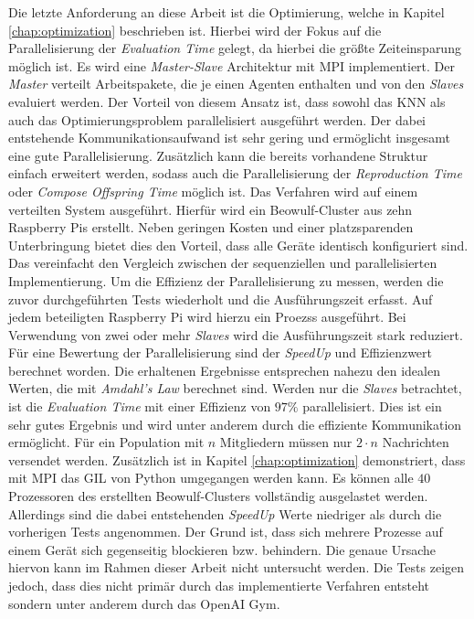 Die letzte Anforderung an diese Arbeit ist die Optimierung, welche in Kapitel \ref{chap:optimization} beschrieben ist. Hierbei wird der Fokus auf die Parallelisierung der \emph{Evaluation Time} gelegt, da hierbei die größte Zeiteinsparung möglich ist. Es wird eine \emph{Master-Slave} Architektur mit \ac{MPI} implementiert. Der \emph{Master} verteilt Arbeitspakete, die je einen Agenten enthalten und von den \emph{Slaves} evaluiert werden. Der Vorteil von diesem Ansatz ist, dass sowohl das \ac{KNN} als auch das Optimierungsproblem parallelisiert ausgeführt werden. Der dabei entstehende Kommunikationsaufwand ist sehr gering und ermöglicht insgesamt eine gute Parallelisierung. Zusätzlich kann die bereits vorhandene Struktur einfach erweitert werden, sodass auch die Parallelisierung der \emph{Reproduction Time} oder \emph{Compose Offspring Time} möglich ist. Das Verfahren wird auf einem verteilten System ausgeführt. Hierfür wird ein Beowulf-Cluster aus zehn Raspberry Pis erstellt. Neben geringen Kosten und einer platzsparenden Unterbringung bietet dies den Vorteil, dass alle Geräte identisch konfiguriert sind. Das vereinfacht den Vergleich zwischen der sequenziellen und parallelisierten Implementierung. Um die Effizienz der Parallelisierung zu messen, werden die zuvor durchgeführten Tests wiederholt und die Ausführungszeit erfasst. Auf jedem beteiligten Raspberry Pi wird hierzu ein Proezss ausgeführt. Bei Verwendung von zwei oder mehr \emph{Slaves} wird die Ausführungszeit stark reduziert. Für eine Bewertung der Parallelisierung sind der \emph{SpeedUp} und Effizienzwert berechnet worden. Die erhaltenen Ergebnisse entsprechen nahezu den idealen Werten, die mit \emph{Amdahl's Law} berechnet sind. Werden nur die \emph{Slaves} betrachtet, ist die \emph{Evaluation Time} mit einer Effizienz von $97\%$ parallelisiert. Dies ist ein sehr gutes Ergebnis und wird unter anderem durch die effiziente Kommunikation ermöglicht. Für ein Population mit $n$ Mitgliedern müssen nur $2 \cdot n$ Nachrichten versendet werden. Zusätzlich ist in Kapitel \ref{chap:optimization} demonstriert, dass mit \ac{MPI} das \ac{GIL} von Python umgegangen werden kann. Es können alle $40$ Prozessoren des erstellten Beowulf-Clusters vollständig ausgelastet werden. Allerdings sind die dabei entstehenden \emph{SpeedUp} Werte niedriger als durch die vorherigen Tests angenommen. Der Grund ist, dass sich mehrere Prozesse auf einem Gerät sich gegenseitig blockieren bzw. behindern. Die genaue Ursache hiervon kann im Rahmen dieser Arbeit nicht untersucht werden. Die Tests zeigen jedoch, dass dies nicht primär durch das implementierte Verfahren entsteht sondern unter anderem durch das OpenAI Gym.
